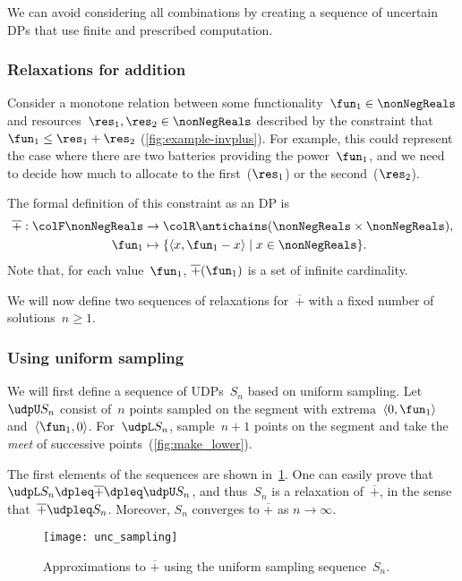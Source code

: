 We can avoid considering all combinations by creating a sequence of
uncertain DPs that use finite and prescribed computation.

\subsubsection{Relaxations for addition}

Consider a monotone relation between some functionality~$\fun_{1}\in\nonNegReals$
and resources~$\res_{1},\res_{2}\in\nonNegReals$ described by
the constraint that~$\fun_{1}\leq\res_{1}+\res_{2}$ (\cref{fig:example-invplus}).
For example, this could represent the case where there are two batteries
providing the power~$\fun_{1}$, and we need to decide how much to
allocate to the first~($\res_{1}$) or the second~($\res_{2}$).


The formal definition of this constraint as an DP is
\begin{align*}
  \overline{+}:{\colF\nonNegReals} & \rightarrow{\colR\antichains(\nonNegReals\times\nonNegReals)},\\
  \fun_{1} & \mapsto\{\left\langle x,\fun_{1}-x\right\rangle \mid x\in\nonNegReals\}.
\end{align*}
Note that, for each value~$\fun_{1}$, $\overline{+}(\fun_{1})$
is a set of infinite cardinality.

We will now define two sequences of relaxations for~$\overline{+}$
with a fixed number of solutions~$n\geq1$.

\subsubsection*{Using uniform sampling}

We will first define a sequence of UDPs~$S_{n}$ based on uniform
sampling. Let~$\udpU S_{n}$ consist of~$n$ points sampled on the
segment with extrema~$\left\langle 0,\fun_{1}\right\rangle $ and~$\left\langle \fun_{1},0\right\rangle $.
For~$\udpL S_{n}$, sample~$n+1$ points on the segment and take
the \emph{meet} of successive points~(\cref{fig:make_lower}).
\begin{center}
  \par
\end{center}

The first elements of the sequences are shown in~\cref{fig:approx_invplus}.
One can easily prove that $\udpL S_{n}\dpleq\overline{+}\dpleq\udpU S_{n}$,
and thus~$S_{n}$ is a relaxation of~$\overline{+}$, in the sense
that~$\overline{+}\udpleq S_{n}$. Moreover, $S_{n}$ converges to
$\overline{+}$ as $n\rightarrow\infty$.
\begin{center}
  \begin{figure}[h]
    \centering{}\texttt{[image: unc\_sampling]}\caption{\label{fig:approx_invplus}Approximations to $\overline{+}$ using
    the uniform sampling sequence~$S_{n}$. }
  \end{figure}
  \par
\end{center}


